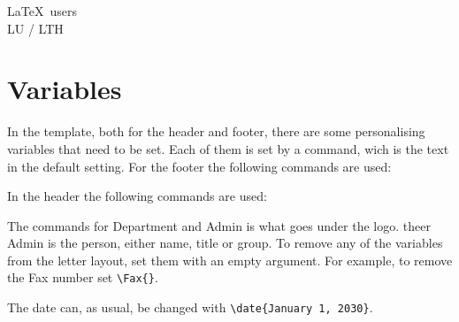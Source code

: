 \documentclass[11pt,eng,LU,logoBW]{LTHletter}
\begin{document}
\begin{letter}{\LaTeX\ users\\ LU / LTH}
  \section{Variables}
  In the template, both for the header and footer, there are some personalising variables that need to be set. Each of them is set by a command, wich is the text in the default setting. For the footer the following commands are used:
  \begin{CodeBox}{}
  \end{CodeBox}
  \noindent In the header the following commands are used:
  \begin{CodeBox}{}
  \end{CodeBox}
  The commands for Department and Admin is what goes under the logo. theer Admin is the person, either name, title or group. To remove any of the variables from the letter layout, set them with an empty argument. For example, to remove the Fax number set \verb|\Fax{}|. 

  The date can, as usual, be changed with \verb|\date{January 1, 2030}|.


\end{letter}
\end{document}
